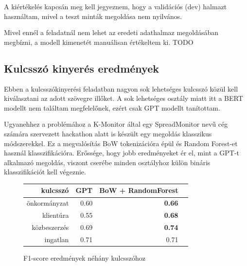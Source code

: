 A kiértékelés kapcsán meg kell jegyeznem, hogy a validációs (dev) halmazt használtam, mivel a teszt minták megoldása nem nyilvános.

Mivel ennél a feladatnál nem lehet az eredeti adathalmaz megoldásában megbízni, a modell kimenetét manuálisan értékeltem ki. TODO

\subsection{Kulcsszó kinyerés eredmények}

Ebben a kulcsszókinyerési feladatban nagyon sok lehetséges kulcsszó közül kell kiválasztani az adott szövegre illőket. A sok lehetséges osztály miatt itt a BERT modellt nem találtam megfelelőnek, ezért csak GPT modellt tanítottam.

Ugyanehhez a problémához a K-Monitor által egy SpreadMonitor nevű cég számára szervezett hackathon alatt is készült egy megoldás klasszikus módszerekkel. Ez a megvalósítás BoW tokenizációra épül és Random Forest-et használ klasszifikációra. Erőssége, hogy jobb eredményeket ér el, mint a GPT-t alkalmazó megoldás, viszont cserébe minden osztályhoz külön bináris klasszifikációt kell végeznie.

\begin{figure}[H]
	\centering
	\begin{tabular}{rrrr}
		kulcsszó & GPT & BoW + RandomForest \\ \hline
		önkormányzat & 0.60 & \textbf{0.66} \\
		klientúra & 0.55 & \textbf{0.68} \\
		közbeszerzés & 0.69 & \textbf{0.74} \\
		ingatlan & 0.71 & 0.71 \\
	\end{tabular}
	\caption{F1-score eredmények néhány kulcsszóhoz}
\end{figure}
